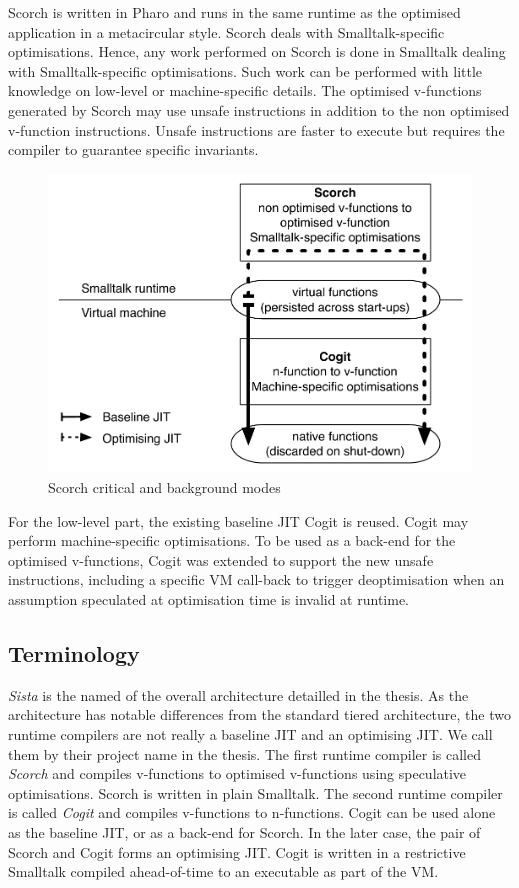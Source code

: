 \documentclass[a4paper,12pt,twoside]{../includes/ThesisStyle}
\begin{document}
Scorch is written in Pharo and runs in the same runtime as the optimised application in a metacircular style. Scorch deals with Smalltalk-specific optimisations. Hence, any work performed on Scorch is done in Smalltalk dealing with Smalltalk-specific optimisations. Such work can be performed with little knowledge on low-level or machine-specific details. The optimised v-functions generated by Scorch may use unsafe instructions in addition to the non optimised v-function instructions. Unsafe instructions are faster to execute but requires the compiler to guarantee specific invariants.

\begin{figure}[h!]
    \begin{center}
        \includegraphics[width=0.8\linewidth]{OptArchitecture}
        \caption{Scorch critical and background modes}
        \label{fig:OptArchitecture}
    \end{center}
\end{figure}

For the low-level part, the existing baseline JIT Cogit is reused. Cogit may perform machine-specific optimisations. To be used as a back-end for the optimised v-functions, Cogit was extended to support the new unsafe instructions, including a specific VM call-back to trigger deoptimisation when an assumption speculated at optimisation time is invalid at runtime.

\subsection{Terminology}
\label{sec:terminologyI}
\emph{Sista} is the named of the overall architecture detailled in the thesis. As the architecture has notable differences from the standard tiered architecture, the two runtime compilers are not really a baseline JIT and an optimising JIT. We call them by their project name in the thesis. The first runtime compiler is called \emph{Scorch} and compiles v-functions to optimised v-functions using speculative optimisations. Scorch is written in plain Smalltalk. The second runtime compiler is called \emph{Cogit} and compiles v-functions to n-functions. Cogit can be used alone as the baseline JIT, or as a back-end for Scorch. In the later case, the pair of Scorch and Cogit forms an optimising JIT. Cogit is written in a restrictive Smalltalk compiled ahead-of-time to an executable as part of the VM. 
\end{document}
